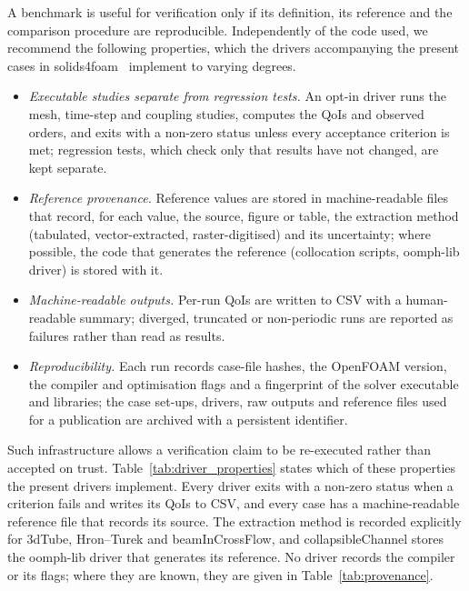 A benchmark is useful for verification only if its definition, its reference and the comparison procedure are reproducible.
Independently of the code used, we recommend the following properties, which the drivers accompanying the present cases in solids4foam~\citep{Cardiff2025} implement to varying degrees.

\begin{itemize}
	\item \emph{Executable studies separate from regression tests.} An opt-in driver runs the mesh, time-step and coupling studies, computes the QoIs and observed orders, and exits with a non-zero status unless every acceptance criterion is met; regression tests, which check only that results have not changed, are kept separate.
	\item \emph{Reference provenance.} Reference values are stored in machine-readable files that record, for each value, the source, figure or table, the extraction method (tabulated, vector-extracted, raster-digitised) and its uncertainty; where possible, the code that generates the reference (collocation scripts, oomph-lib driver) is stored with it.
	\item \emph{Machine-readable outputs.} Per-run QoIs are written to CSV with a human-readable summary; diverged, truncated or non-periodic runs are reported as failures rather than read as results.
	\item \emph{Reproducibility.} Each run records case-file hashes, the OpenFOAM version, the compiler and optimisation flags and a fingerprint of the solver executable and libraries; the case set-ups, drivers, raw outputs and reference files used for a publication are archived with a persistent identifier.
\end{itemize}

Such infrastructure allows a verification claim to be re-executed rather than accepted on trust.
Table~\ref{tab:driver_properties} states which of these properties the present drivers implement. Every driver exits with a non-zero status when a criterion fails and writes its QoIs to CSV, and every case has a machine-readable reference file that records its source. The extraction method is recorded explicitly for 3dTube, Hron--Turek and beamInCrossFlow, and collapsibleChannel stores the oomph-lib driver that generates its reference. No driver records the compiler or its flags; where they are known, they are given in Table~\ref{tab:provenance}.

